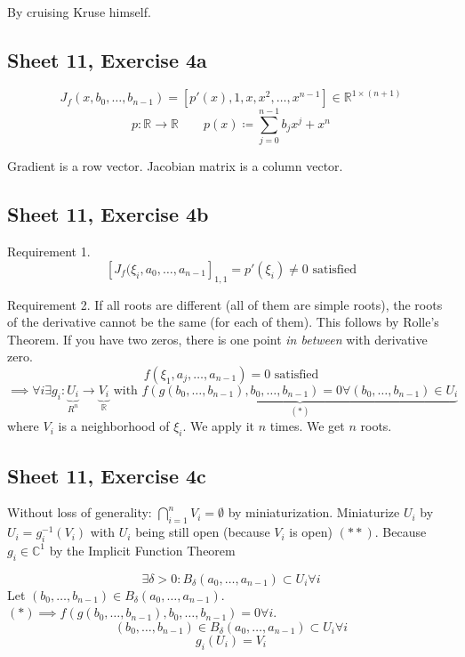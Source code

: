 \documentclass{article}
\begin{document}
By cruising Kruse himself.

\subsection{Sheet 11, Exercise 4a}
\[ J_f(x, b_0, \dots, b_{n-1}) = \left[p'(x), 1, x, x^2, \dots, x^{n-1}\right] \in \mathbb R^{1 \times (n+1)} \]
\[ p: \mathbb R \to \mathbb R \qquad p(x) \coloneqq \sum_{j=0}^{n-1} b_j x^j + x^n \]

Gradient is a row vector. Jacobian matrix is a column vector.

\subsection{Sheet 11, Exercise 4b}
Requirement 1.
\[ \left[J_f(\xi_i, a_0, \dots, a_{n-1}\right]_{1,1} = p'(\xi_i) \neq 0 \text{ satisfied} \]

Requirement 2.
If all roots are different (all of them are simple roots), the roots of the derivative cannot be the same (for each of them). This follows by Rolle's Theorem. If you have two zeros, there is one point \emph{in between} with derivative zero.
\[ f(\xi_1, a_j, \dots, a_{n-1}) = 0 \text{ satisfied} \]
\[ \implies \forall i \exists g_i: \underbrace{U_i}_{R^n} \to \underbrace{V_i}_{\mathbb R} \text{ with } \underbrace{f(g(b_0, \dots, b_{n-1}), b_0, \dots, b_{n-1}) = 0 \forall (b_0, \dots, b_{n-1}) \in U_i}_{(*)} \]
where $V_i$ is a neighborhood of $\xi_i$.
We apply it $n$ times. We get $n$ roots.

\subsection{Sheet 11, Exercise 4c}

Without loss of generality: $\bigcap_{i=1}^n V_i = \emptyset$ by miniaturization.
Miniaturize $U_i$ by $U_i = g_i^{-1}(V_i)$ with $U_i$ being still open (because $V_i$ is open) $(**)$.
Because $g_i \in \mathbb C^{1}$ by the Implicit Function Theorem

\[ \exists \delta > 0: B_{\delta}(a_0, \dots, a_{n-1}) \subset U_i \forall i \]
Let $(b_0, \dots, b_{n-1}) \in B_{\delta}(a_0, \dots, a_{n-1})$. $(*) \implies f(g(b_0, \dots, b_{n-1}), b_0, \dots, b_{n-1}) = 0 \forall i$.
\[ (b_0, \dots, b_{n-1}) \in B_{\delta}(a_0, \dots, a_{n-1}) \subset U_i \forall i \]
\[ g_i(U_i) = V_i \]
\end{document}
